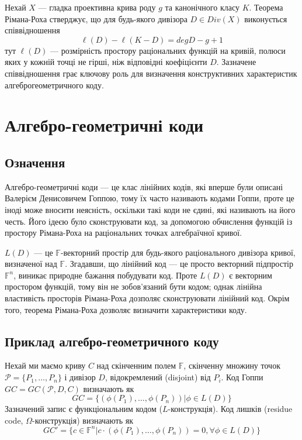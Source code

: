 \documentclass[a4paper,12pt,oneside]{article}
\begin{document}
Нехай $X$ --- гладка проективна крива роду $g$ та канонічного класу $K$. Теорема Рімана-Роха стверджує, 
що для будь-якого дивізора $D \in Div(X)$ виконується співвідношення
$$\ell(D) - \ell(K-D) = deg D - g +1$$
тут $\ell(D)$ --- розмірність простору раціональних функцій на кривій, полюси яких у кожній точці не гірші, 
ніж відповідні коефіцієнти $D$. Зазначене співвідношення грає ключову роль для визначення конструктивних 
характеристик алгеброгеометричного коду.

\pagebreak
\section{Алгебро-геометричні коди}
\subsection{Означення}
Алгебро-геометричні коди --- це клас лінійних кодів, які вперше були описані Валерієм Денисовичем Гоппою, 
тому їх часто називають кодами Гоппи, проте це іноді може вносити неясність, оскільки такі коди не єдині, які називають на його честь. 
Його ідеєю було сконструювати код, за допомогою обчислення функцій із простору Рімана-Роха на раціональних точках алгебраїчної кривої. 

$L(D)$ --- це $\mathbb{F}$-векторний простір для будь-якого раціонального дивізора кривої, визначеної над $\mathbb{F}$. 
Згадавши, що лінійний код --- це просто векторний підпростір $\mathbb{F}^n$, виникає природне бажання побудувати код. 
Проте $L(D)$ є векторним простором функцій, тому він не зобов'язаний бути кодом; однак лінійна властивість просторів Рімана-Роха дозполяє сконструювати лінійний код. 
Окрім того, теорема Рімана-Роха дозволяє визначити характеристики коду.

\subsection{Приклад алгебро-геометричного коду}
Нехай ми маємо криву $C$ над скінченним полем $\mathbb{F}$, скінченну множину точок $\mathcal{P} = \{P_1, \dots , P_n \}$ і дивізор $D$, відокремлений (disjoint) від $P_i$. 
Код Гоппи $GC = GC(\mathcal{P}, D, C)$ визначають як
$$GC = \{ (\phi(P_1), \dots , \phi(P_n)) | \phi \in L(D) \}$$
Зазначений запис є функціональним кодом ($L$-конструкція). Код лишків (residue code, $\Omega$-конструкція) визначають як
$$GC' = \{ c \in \mathbb{F}^n | c \cdot (\phi(P_1), \dots , \phi(P_n)) = 0, \forall \phi \in L(D) \}$$
\end{document}
